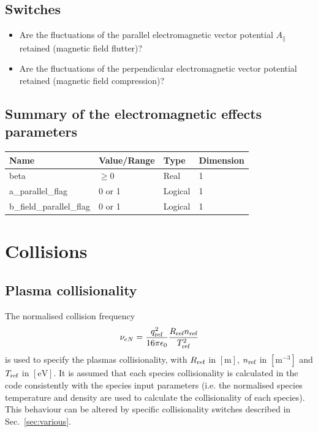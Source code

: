 \documentclass[fleqn]{report}
\begin{document}
\subsection{Switches}
\begin{itemize}
\item Are the fluctuations of the parallel electromagnetic vector potential $A_\parallel$ retained (magnetic field flutter)?
\item Are the fluctuations of the perpendicular electromagnetic vector potential retained (magnetic field compression)?
\end{itemize}

\subsection{Summary of the electromagnetic effects parameters}
\begin{tabularx}{\textwidth}{|X|Y|Y|Y|}
\hline
Name & Value/Range & Type & Dimension \\
\hline
beta & $\geq 0$ & Real & 1 \\
a\_parallel\_flag & 0 or 1 & Logical & 1 \\
b\_field\_parallel\_flag & 0 or 1 & Logical & 1 \\
\hline
\end{tabularx}

\section{Collisions}
\subsection{Plasma collisionality}
The normalised collision frequency
\begin{equation}
 \nu_{eN} = \frac{q_{\textrm{ref}}^2}{16\pi\epsilon_0}\frac{R_{\textrm{ref}} n_{\textrm{ref}}}{T_{\textrm{ref}}^2}
\end{equation}
is used to specify the plasmas collisionality, with $R_{\textrm{ref}}$ in $[\textrm{m}]$, $n_{\textrm{ref}}$ in $[\textrm{m}^{-3}]$ and $T_{\textrm{ref}}$ in $[\textrm{eV}]$. It is assumed that each species collisionality is calculated in the code consistently with the species input parameters (i.e. the normalised species temperature and density are used to calculate the collisionality of each species). This behaviour can be altered by specific collisionality switches described in Sec.~\ref{sec:various}.\\
\end{document}

